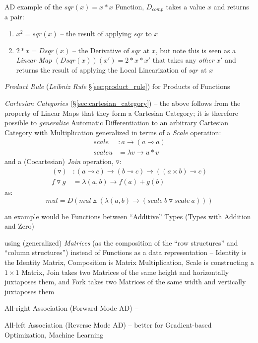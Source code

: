 AD example of the $sqr(x) = x * x$ Function, $D_{comp}$ takes a value $x$ and
returns a pair:
\begin{enumerate}
  \item $x^2 = sqr(x)$ -- the result of applying $sqr$ to $x$
  \item $2*x = D sqr(x)$ -- the Derivative of $sqr$ at $x$, but note this is
    seen as a \emph{Linear Map} $(D sqr(x)) (x') = 2 * x * x'$ that takes any
    \emph{other} $x'$ and returns the result of applying the Local Linearization
    of $sqr$ at $x$
\end{enumerate}

\emph{Product Rule} (\emph{Leibniz Rule} \S\ref{sec:product_rule}) for Products
of Functions

\emph{Cartesian Categories} (\S\ref{sec:cartesian_category}) -- the above
follows from the property of Linear Maps that they form a Cartesian Category; it
is therefore possible to \emph{generalize} Automatic Differentiation to an
arbitrary Cartesian Category with Multiplication generalized in terms of a
\emph{Scale} operation:
\begin{align*}
scale   & : a \rightarrow (a \multimap a) \\
scale u & = \lambda v \rightarrow u * v
\end{align*}
and a (Cocartesian) \emph{Join} operation, $\triangledown$:
\begin{align*}
  (\triangledown)   & : (a \multimap c) \rightarrow (b \multimap c) \rightarrow
    ((a \times b) \multimap c) \\
  f \triangledown g & = \lambda (a,b) \rightarrow f(a) + g(b)
\end{align*}
as:
\[
mul = D (mul \vartriangle
  (\lambda (a,b) \rightarrow (scale\ b \triangledown scale\ a)))
\]

an example would be Functions between ``Additive'' Types (Types with Addition
and Zero)

using (generalized) \emph{Matrices} (as the composition of the ``row
structures'' and ``column structures'') instead of Functions as a data
representation -- Identity is the Identity Matrix, Composition is Matrix
Multiplication, Scale is constructing a $1 \times 1$ Matrix, Join takes two
Matrices of the same height and horizontally juxtaposes them, and Fork takes two
Matrices of the same width and vertically juxtaposes them

All-right Association (Forward Mode AD) --

All-left Association (Reverse Mode AD) -- better for Gradient-based
Optimization, Machine Learning

